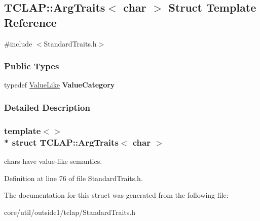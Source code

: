 \hypertarget{structTCLAP_1_1ArgTraits_3_01char_01_4}{}\subsection{T\+C\+L\+AP\+:\+:Arg\+Traits$<$ char $>$ Struct Template Reference}
\label{structTCLAP_1_1ArgTraits_3_01char_01_4}


{\ttfamily \#include $<$Standard\+Traits.\+h$>$}

\subsubsection*{Public Types}
\begin{DoxyCompactItemize}
\item 
typedef \hyperlink{structTCLAP_1_1ValueLike}{Value\+Like} {\bfseries Value\+Category}\hypertarget{structTCLAP_1_1ArgTraits_3_01char_01_4_a36f7fe1b3b1649ef8ec08ef7d6fc3160}{}\label{structTCLAP_1_1ArgTraits_3_01char_01_4_a36f7fe1b3b1649ef8ec08ef7d6fc3160}

\end{DoxyCompactItemize}


\subsubsection{Detailed Description}
\subsubsection*{template$<$$>$\\*
struct T\+C\+L\+A\+P\+::\+Arg\+Traits$<$ char $>$}

chars have value-\/like semantics. 

Definition at line 76 of file Standard\+Traits.\+h.



The documentation for this struct was generated from the following file\+:\begin{DoxyCompactItemize}
\item 
core/util/outside1/tclap/Standard\+Traits.\+h\end{DoxyCompactItemize}
